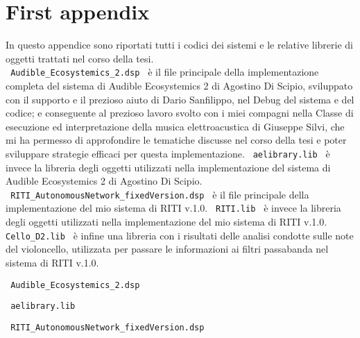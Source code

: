 \section{First appendix}

In questo appendice sono riportati tutti i codici dei sistemi
e le relative librerie di oggetti trattati nel corso della tesi. \\
\verb| Audible_Ecosystemics_2.dsp | è il file principale della implementazione 
completa del sistema di Audible Ecosystemics 2 di Agostino Di Scipio, sviluppato con il supporto
e il prezioso aiuto di Dario Sanfilippo, nel Debug del sistema e del codice; 
e conseguente al prezioso lavoro svolto con i miei compagni nella Classe di esecuzione ed interpretazione 
della musica elettroacustica di Giuseppe Silvi, che mi ha permesso di approfondire le tematiche
discusse nel corso della tesi e poter sviluppare strategie efficaci per questa implementazione.
\verb| aelibrary.lib | è invece la libreria degli oggetti utilizzati nella implementazione del sistema
di Audible Ecosystemics 2 di Agostino Di Scipio. \\
\verb| RITI_AutonomousNetwork_fixedVersion.dsp | è il file principale della implementazione 
del mio sistema di RITI v.1.0. \verb| RITI.lib | è invece la libreria degli oggetti utilizzati nella 
implementazione del mio sistema di RITI v.1.0. \verb| Cello_D2.lib | è infine una libreria
con i risultati delle analisi condotte sulle note del violoncello, utilizzata per passare le informazioni
ai filtri passabanda nel sistema di RITI v.1.0. \\
\clearpage


\begin{center} \Large \verb| Audible_Ecosystemics_2.dsp | \normalsize \\
    \vspace{0.2cm} \end{center}

\clearpage

\begin{center} \Large \verb| aelibrary.lib | \normalsize \\
    \vspace{0.2cm} \end{center}

\clearpage

\begin{center} \Large \verb| RITI_AutonomousNetwork_fixedVersion.dsp | \normalsize \\
    \vspace{0.2cm} \end{center}

\clearpage

